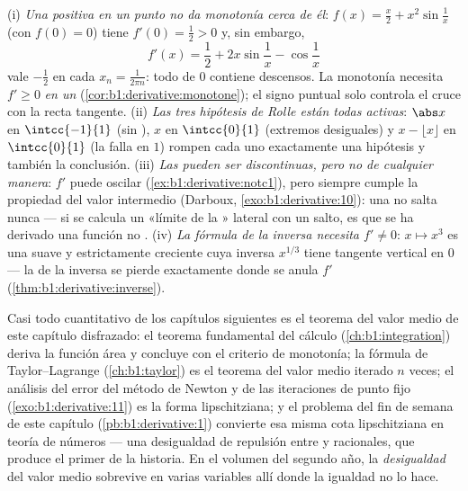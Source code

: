 \begin{remark}
(i) \emph{Una  positiva en un punto no da monotonía cerca de
él}: $f(x) = \frac x2 + x^2\sin\frac1x$ (con $f(0) = 0$) tiene
$f'(0) = \frac12 > 0$ y, sin embargo,
\[
f'(x) = \frac12 + 2x\sin\frac1x - \cos\frac1x
\]
vale $-\frac12$ en cada $x_n = \frac{1}{2\pi n}$: todo  de
$0$ contiene descensos. La monotonía necesita $f' \geq 0$
\emph{en un } (\cref{cor:b1:derivative:monotone}); el signo
puntual solo controla el cruce con la recta tangente. (ii) \emph{Las
tres hipótesis de Rolle están todas activas}: $\abs x$ en
$\intcc{-1}{1}$ (sin  ), $x$ en $\intcc{0}{1}$
(extremos desiguales) y $x - \lfloor x\rfloor$ en $\intcc{0}{1}$ (la
 falla en $1$) rompen cada uno exactamente una hipótesis
y también la conclusión. (iii) \emph{Las  pueden ser
discontinuas, pero no de cualquier manera}: $f'$ puede oscilar
(\cref{ex:b1:derivative:notc1}), pero siempre cumple la propiedad del
valor intermedio (Darboux, \cref{exo:b1:derivative:10}): una
 no salta nunca --- si se calcula un «límite de la
» lateral con un salto, es que se ha derivado una función
no . (iv) \emph{La fórmula de la inversa necesita
$f' \neq 0$}: $x \mapsto x^3$ es una  suave y estrictamente
creciente cuya inversa $x^{1/3}$ tiene tangente vertical en $0$ --- la
 de la inversa se pierde exactamente donde se anula $f'$
(\cref{thm:b1:derivative:inverse}).
\end{remark}

\begin{remark}
Casi todo  cuantitativo de los capítulos siguientes es el
teorema del valor medio de este capítulo disfrazado: el teorema
fundamental del cálculo (\cref{ch:b1:integration}) deriva la función
área y concluye con el criterio de monotonía; la fórmula de
Taylor--Lagrange (\cref{ch:b1:taylor}) es el teorema del valor medio
iterado $n$ veces; el análisis del error del método de Newton y de las
iteraciones de punto fijo (\cref{exo:b1:derivative:11}) es la forma
lipschitziana; y el problema del fin de semana de este capítulo
(\cref{pb:b1:derivative:1}) convierte esa misma cota lipschitziana en
teoría de números --- una desigualdad de repulsión entre  y racionales, que produce el primer 
de la historia. En el volumen del segundo año, la \emph{desigualdad}
del valor medio sobrevive en varias variables allí donde la igualdad
no lo hace.
\end{remark}

